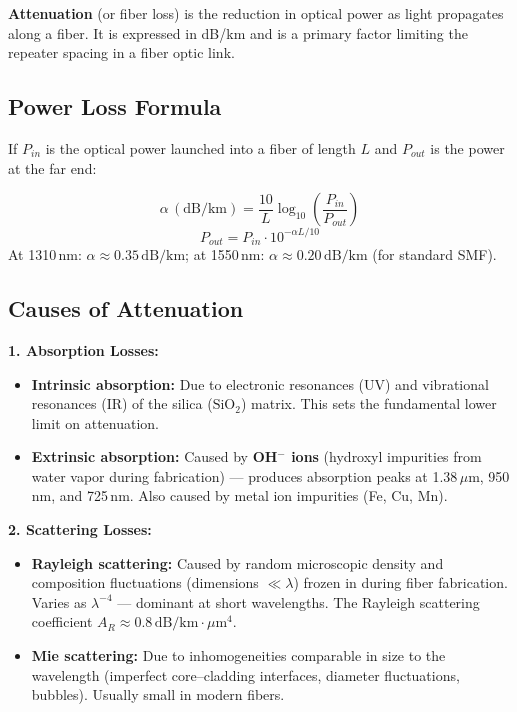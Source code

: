 \documentclass[12pt,a4paper]{article}
\begin{document}
\begin{tcolorbox}[defbox, title={\textbf{Definition of Attenuation}}]
\textbf{Attenuation} (or fiber loss) is the reduction in optical power as light propagates along a fiber. It is expressed in dB/km and is a primary factor limiting the repeater spacing in a fiber optic link.
\end{tcolorbox}

\subsection{Power Loss Formula}
If $P_{in}$ is the optical power launched into a fiber of length $L$ and $P_{out}$ is the power at the far end:
\begin{tcolorbox}[formulabox, title={\textbf{Attenuation Coefficient}}]
\[
\alpha\,(\text{dB/km}) = \frac{10}{L}\log_{10}\!\left(\frac{P_{in}}{P_{out}}\right)
\]
\[
P_{out} = P_{in} \cdot 10^{-\alpha L/10}
\]
At 1310\,nm: $\alpha \approx 0.35\,\text{dB/km}$; at 1550\,nm: $\alpha \approx 0.20\,\text{dB/km}$ (for standard SMF).
\end{tcolorbox}

\subsection{Causes of Attenuation}

\textbf{1. Absorption Losses:}
\begin{itemize}[leftmargin=*, itemsep=2pt]
  \item \textbf{Intrinsic absorption:} Due to electronic resonances (UV) and vibrational resonances (IR) of the silica ($\text{SiO}_2$) matrix. This sets the fundamental lower limit on attenuation.
  \item \textbf{Extrinsic absorption:} Caused by \textbf{OH$^-$ ions} (hydroxyl impurities from water vapor during fabrication) --- produces absorption peaks at 1.38\,$\mu$m, 950\,nm, and 725\,nm. Also caused by metal ion impurities (Fe, Cu, Mn).
\end{itemize}

\textbf{2. Scattering Losses:}
\begin{itemize}[leftmargin=*, itemsep=2pt]
  \item \textbf{Rayleigh scattering:} Caused by random microscopic density and composition fluctuations (dimensions $\ll \lambda$) frozen in during fiber fabrication. Varies as $\lambda^{-4}$ --- dominant at short wavelengths. The Rayleigh scattering coefficient $A_R \approx 0.8\,\text{dB/km}\cdot\mu\text{m}^4$.
  \item \textbf{Mie scattering:} Due to inhomogeneities comparable in size to the wavelength (imperfect core--cladding interfaces, diameter fluctuations, bubbles). Usually small in modern fibers.
\end{itemize}
\end{document}
